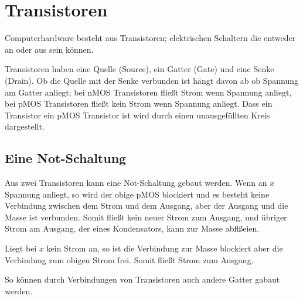\documentclass{article}
\begin{document}
\section{Transistoren} 
Computerhardware besteht aus Transistoren; elektrischen Schaltern die entweder an oder aus sein können.

Transistoren haben eine Quelle (Source), ein Gatter (Gate) und eine Senke (Drain). Ob die Quelle mit der Senke verbunden ist hängt davon ab ob Spannung am Gatter anliegt; bei nMOS Transistoren fließt Strom wenn Spannung anliegt, bei pMOS Transistoren fließt kein Strom wenn Spannung anliegt. Dass ein Transistor ein pMOS Transistor ist wird durch einen unausgefüllten Kreis dargestellt.

\subsection{Eine Not-Schaltung}
Aus zwei Transistoren kann eine Not-Schaltung gebaut werden.
Wenn an $x$ Spannung anliegt, so wird der obige pMOS blockiert und es besteht keine Verbindung zwischen dem Strom und dem Ausgang, aber der Ausgang und die Masse ist verbunden. Somit fließt kein neuer Strom zum Ausgang, und übriger Strom am Ausgang, \zb der eines Kondensators, kann zur Masse abflßeien.

Liegt bei $x$ kein Strom an, so ist die Verbindung zur Masse blockiert aber die Verbindung zum obigen Strom frei. Somit fließt Strom zum Ausgang.

So können durch Verbindungen von Transistoren auch andere Gatter gabaut werden.
\end{document}
